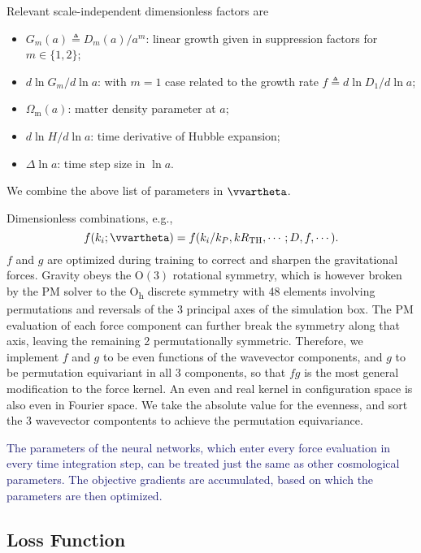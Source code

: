 \documentclass[modern, trackchanges, dvipsnames]{aastex631}
\renewcommand{\d}{d}
\newcommand{\lna}{\ln\!a}
\newcommand{\Omegam}{\Omega_\mathrm{m}}
\newcommand{\tophat}{\mathrm{TH}}
\newcommand{\YZ}[1]{\textcolor{MidnightBlue}{#1}}
\begin{document}
Relevant scale-independent dimensionless factors are
\begin{itemize}
\item $G_m(a) \triangleq D_m(a) / a^m$: linear growth given in
  suppression factors for $m \in \{1, 2\}$;
\item $\d\ln G_m / \d\lna$: with $m=1$ case related to the growth rate
  $f \triangleq \d\ln D_1 / \d\lna$;
\item $\Omegam(a)$: matter density parameter at $a$;
\item $\d\ln\!H / \d\lna$: time derivative of Hubble expansion;
\item $\Delta\lna$: time step size in $\lna$.
\end{itemize}

We combine the above list of parameters in $\vvartheta$.

Dimensionless combinations, e.g.,
%
\begin{equation}
f(k_i; \vvartheta) = f(k_i/k_P, kR_\tophat, \cdots; D, f, \cdots).
\end{equation}
%
$f$ and $g$ are optimized during training to correct and sharpen the
gravitational forces.
Gravity obeys the $\mathrm{O}(3)$ rotational symmetry, which is however
broken by the PM solver to the O\textsubscript{h} discrete symmetry with
48 elements involving permutations and reversals of the 3 principal axes
of the simulation box.
The PM evaluation of each force component can further break the symmetry
along that axis, leaving the remaining 2 permutationally symmetric.
Therefore, we implement $f$ and $g$ to be even functions of the
wavevector components, and $g$ to be permutation equivariant in all 3
components, so that $f g$ is the most general modification to the force
kernel.
An even and real kernel in configuration space is also even in Fourier
space.
We take the absolute value for the evenness, and sort the 3 wavevector
compontents to achieve the permutation equivariance.

\YZ{
The parameters of the neural networks, which enter every force evaluation in
every time integration step, can be treated just the same as other cosmological
parameters.
The objective gradients are accumulated, based on which the parameters are then
optimized.
}


\vspace{1em}
\subsection{Loss Function}
\end{document}
